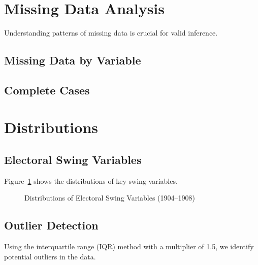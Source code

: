 \documentclass[11pt]{article}
\begin{document}
\section{Missing Data Analysis}

Understanding patterns of missing data is crucial for valid inference.

\subsection{Missing Data by Variable}


\subsection{Complete Cases}


\section{Distributions}

\subsection{Electoral Swing Variables}

Figure~\ref{fig:distributions} shows the distributions of key swing variables.

\begin{figure}[H]
\centering
\caption{Distributions of Electoral Swing Variables (1904--1908)}
\label{fig:distributions}
\end{figure}

\subsection{Outlier Detection}

Using the interquartile range (IQR) method with a multiplier of 1.5, we identify potential outliers in the data.
\end{document}
